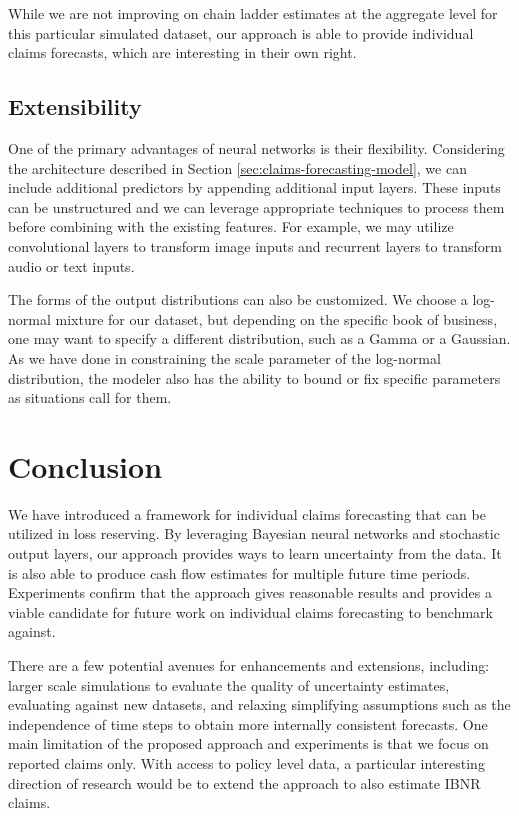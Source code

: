 \documentclass{article}
\begin{document}
While we are not improving on chain ladder estimates at the aggregate level for 
this particular simulated dataset, our approach is able to provide individual 
claims forecasts, which are interesting in their own right.

\subsection{Extensibility}

One of the primary advantages of neural networks is their flexibility. 
Considering the architecture described in Section 
\ref{sec:claims-forecasting-model}, we can include additional predictors by 
appending additional input layers. These inputs can be unstructured and we can 
leverage appropriate techniques to process them before combining with the 
existing features. For example, we may utilize convolutional layers to transform
image inputs and recurrent layers to transform audio or text inputs.

The forms of the output distributions can also be customized. We choose a 
log-normal mixture for our dataset, but depending on the specific book of 
business, one may want to specify a different distribution, such as a Gamma or a
Gaussian. As we have done in constraining the scale parameter of the log-normal 
distribution, the modeler also has the ability to bound or fix specific 
parameters as situations call for them.

\section{Conclusion}

We have introduced a framework for individual claims forecasting that can be 
utilized in loss reserving. By leveraging Bayesian neural networks and 
stochastic output layers, our approach provides ways to learn uncertainty from 
the data. It is also able to produce cash flow estimates for multiple future
time periods. Experiments confirm that the approach gives reasonable results and
provides a viable candidate for future work on individual claims forecasting to 
benchmark against.

There are a few potential avenues for enhancements and extensions, including: 
larger scale simulations to evaluate the quality of uncertainty estimates, 
evaluating against new datasets, and relaxing simplifying assumptions such as 
the independence of time steps to obtain more internally consistent forecasts.
One main limitation of the proposed approach and experiments is that we focus on
reported claims only. With access to policy level data, a particular interesting 
direction of research would be to extend the approach to also estimate IBNR claims.
\end{document}
